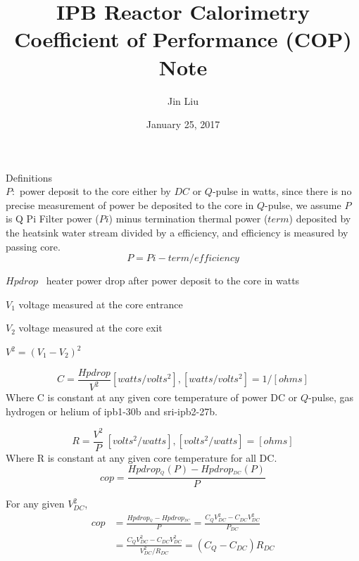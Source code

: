 \documentclass{article}%
\begin{document}
\title{IPB Reactor Calorimetry Coefficient of Performance (COP) Note}
\author{Jin Liu }
\date{January 25, 2017}
\maketitle

Definitions\\

$P:$ power deposit to the core either by $DC$ or $Q$-pulse in watts, since there is no precise measurement of power be deposited to the core in $Q$-pulse, we assume $P$ is Q Pi Filter power ($Pi$) minus termination thermal power ($term$) deposited by the heatsink water stream divided by a efficiency, and efficiency is measured by passing core.\\
$$ 
P = Pi - term/efficiency \label{1}%
$$

$Hpdrop$ \ heater power drop after power deposit to the core in watts

$V_{1}$ voltage measured at the core entrance

$V_{2}$ voltage measured at the core exit

$V^{2}=(V_{1}-V_{2})^{2}$%


\begin{equation}
C=\frac{Hpdrop}{V^{2}}[watts/volts^{2}], [watts/volts^{2}] = 1/[ohms] \label{2}%
\end{equation}
%
Where C is constant at any given core temperature of power DC or $Q$-pulse, gas hydrogen or helium of ipb1-30b and sri-ipb2-27b. 
 
\begin{equation}
R=\frac{V^{2}}{P}\ [volts^{2}/watts], [volts^{2}/watts]=[ohms]\label{3}%
\end{equation}
%
Where R is constant at any given core temperature for all DC.
\begin{equation}
cop=\frac{Hpdrop_{^{Q}}(P)-Hpdrop_{^{DC}}(P)}{P}\label{4}%
\end{equation}


For any given $V_{DC}^{2}$,
\begin{align}
cop & =\frac{Hpdrop_{^{Q}}-Hpdrop_{^{DC}}}{P}=\frac{C_{Q}V_{DC}^{2}%
-C_{DC}V_{DC}^{2}}{P_{DC}}\nonumber\\
& =\frac{C_{Q}V_{DC}^{2}-C_{DC}V_{DC}^{2}}{V_{DC}^{2}/R_{DC}}=\left(
C_{Q}-C_{DC}\right)  R_{DC}\label{5}%
\end{align}
\end{document}
